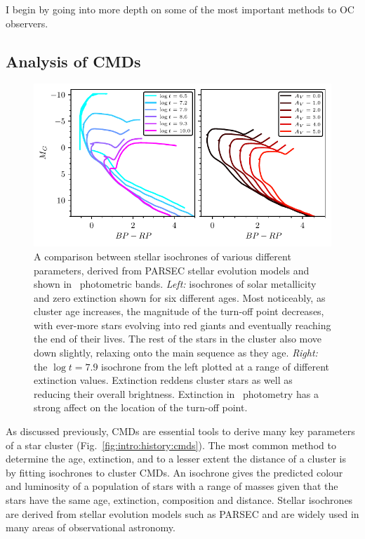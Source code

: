 I begin by going into more depth on some of the most important methods to OC observers.


\subsection{Analysis of CMDs}
\label{sec:intro:theory:cmds}

\begin{figure}[tb]
	\includegraphics[width=\textwidth]{fig/c1/isochrones.pdf}
	\caption[A comparison between stellar isochrones of various different parameters.]{A comparison between stellar isochrones of various different parameters, derived from PARSEC stellar evolution models \citep{bressan_parsec_2012} and shown in \gaia\ photometric bands. \emph{Left:} isochrones of solar metallicity and zero extinction shown for six different ages. Most noticeably, as cluster age increases, the magnitude of the turn-off point decreases, with ever-more stars evolving into red giants and eventually reaching the end of their lives. The rest of the stars in the cluster also move down slightly, relaxing onto the main sequence as they age. \emph{Right:} the $\log t = 7.9$ isochrone from the left plotted at a range of different extinction values. Extinction reddens cluster stars as well as reducing their overall brightness. Extinction in \gaia\ photometry has a strong affect on the location of the turn-off point.}
	\label{fig:intro:history:isochrones}
\end{figure}

As discussed previously, CMDs are essential tools to derive many key parameters of a star cluster (Fig.~\ref{fig:intro:history:cmds}). The most common method to determine the age, extinction, and to a lesser extent the distance of a cluster is by fitting isochrones to cluster CMDs. An isochrone gives the predicted colour and luminosity of a population of stars with a range of masses given that the stars have the same age, extinction, composition and distance. Stellar isochrones are derived from stellar evolution models such as PARSEC \citep{bressan_parsec_2012} and are widely used in many areas of observational astronomy.

